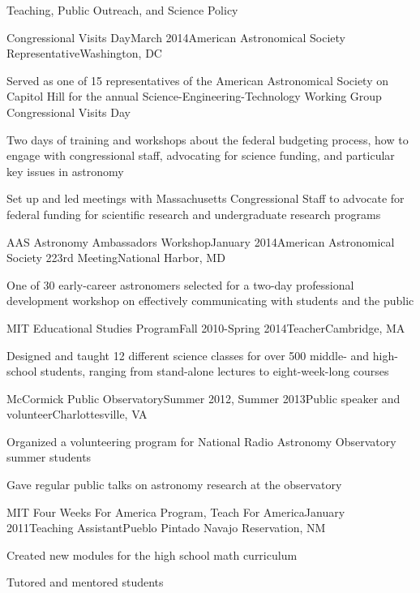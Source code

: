 \documentclass{resume} %
\begin{document}
\begin{rSection}{Teaching, Public Outreach, and Science Policy}

\begin{rSubsection}{Congressional Visits Day}{March 2014}{American Astronomical Society Representative}{Washington, DC}
\item Served as one of 15 representatives of the American Astronomical Society on Capitol Hill for the annual Science-Engineering-Technology Working Group Congressional Visits Day
\item Two days of training and workshops about the federal budgeting process, how to engage with congressional staff, advocating for science funding, and particular key issues in astronomy
\item Set up and led meetings with Massachusetts Congressional Staff to advocate for federal funding for scientific research and undergraduate research programs
\end{rSubsection}

\begin{rSubsection}{AAS Astronomy Ambassadors Workshop}{January 2014}{American Astronomical Society 223rd Meeting}{National Harbor, MD}
\item One of 30 early-career astronomers selected for a two-day professional development workshop on effectively communicating with students and the public
\end{rSubsection}

\begin{rSubsection}{MIT Educational Studies Program}{Fall 2010-Spring 2014}{Teacher}{Cambridge, MA}
\item Designed and taught 12 different science classes for over 500 middle- and high-school students, ranging from stand-alone lectures to eight-week-long courses
\end{rSubsection}

\begin{rSubsection}{McCormick Public Observatory}{Summer 2012, Summer 2013}{Public speaker and volunteer}{Charlottesville, VA}
\item Organized a volunteering program for National Radio Astronomy Observatory summer students
\item Gave regular public talks on astronomy research at the observatory
\end{rSubsection}

\begin{rSubsection}{MIT Four Weeks For America Program, Teach For America}{January 2011}{Teaching Assistant}{Pueblo Pintado Navajo Reservation, NM}
\item Created new modules for the high school math curriculum
\item Tutored and mentored students
\end{rSubsection}

\end{rSection}
\end{document}
